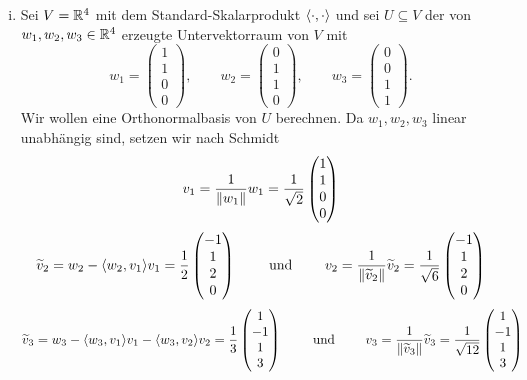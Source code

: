 \begin{beispiel}
\begin{enumerate}[(i)]
		\item Sei $V = \mathbb{R}^4$ mit dem Standard-Skalarprodukt $\left\langle\cdot,\cdot\right\rangle$ und sei $U \subseteq V$ der von $w_1,w_2,w_3 \in \mathbb{R}^4$ erzeugte Untervektorraum von $V$ mit
		\[
			w_1 = \begin{pmatrix} 1 \\ 1 \\ 0 \\ 0 \end{pmatrix}, \qquad
			w_2 = \begin{pmatrix} 0 \\ 1 \\ 1 \\ 0 \end{pmatrix}, \qquad 
			w_3 = \begin{pmatrix} 0 \\ 0 \\ 1 \\ 1 \end{pmatrix}.
		\]
		Wir wollen eine Orthonormalbasis von $U$ berechnen.
		Da $w_1,w_2,w_3$ linear unabhängig sind, setzen wir nach Schmidt
		\[
			v_1 = \frac{1}{\left\lVert w_1\right\rVert} w_1 = \frac{1}{\sqrt{2}} \begin{pmatrix} 1 \\ 1 \\ 0 \\ 0 \end{pmatrix}
		\]
		\[
			\widetilde{v}_2 = w_2 - \sk{w_2,v_1} v_1 = \frac{1}{2} \begin{pmatrix} -1 \\ 1 \\ 2 \\ 0 \end{pmatrix} \qquad \text{ und } \qquad 
			v_2 = \frac{1}{\no{\widetilde{v}_2}} \widetilde{v}_2 = \frac{1}{\sqrt{6}} \begin{pmatrix} -1 \\ 1 \\ 2 \\ 0 \end{pmatrix}
		\]
		\[
			\widetilde{v}_3 = w_3 - \sk{w_3,v_1} v_1 - \sk{w_3,v_2} v_2 = \frac{1}{3}\begin{pmatrix} 1 \\ -1 \\ 1 \\ 3 \end{pmatrix} \qquad \text{ und } \qquad 
			v_3 = \frac{1}{\no{\widetilde{v}_3}} \widetilde{v}_3 = \frac{1}{\sqrt{12}} \begin{pmatrix} 1 \\ -1 \\ 1 \\ 3 \end{pmatrix}
\]
\end{enumerate}
\end{beispiel}

